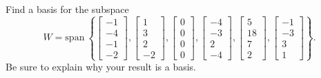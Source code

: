 \documentclass{article}
\begin{document}
\begin{exerciseStatement}
    Find a basis for the subspace
\[W=\mathrm{span}\ \left\{\left[\begin{array}{r}
-1 \\
-4 \\
-1 \\
-2
\end{array}\right] , \left[\begin{array}{r}
1 \\
3 \\
2 \\
-2
\end{array}\right] , \left[\begin{array}{r}
0 \\
0 \\
0 \\
0
\end{array}\right] , \left[\begin{array}{r}
-4 \\
-3 \\
2 \\
-4
\end{array}\right] , \left[\begin{array}{r}
5 \\
18 \\
7 \\
2
\end{array}\right] , \left[\begin{array}{r}
-1 \\
-3 \\
3 \\
1
\end{array}\right]\right\}.\]
 Be sure to explain why your result is a basis.


  
\end{exerciseStatement}
\end{document}
